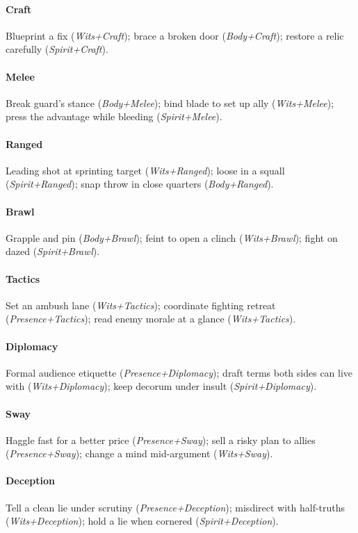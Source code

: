 \paragraph{Craft}
Blueprint a fix (\emph{Wits+Craft}); brace a broken door (\emph{Body+Craft}); restore a relic carefully (\emph{Spirit+Craft}).

\paragraph{Melee}
Break guard's stance (\emph{Body+Melee}); bind blade to set up ally (\emph{Wits+Melee}); press the advantage while bleeding (\emph{Spirit+Melee}).

\paragraph{Ranged}
Leading shot at sprinting target (\emph{Wits+Ranged}); loose in a squall (\emph{Spirit+Ranged}); snap throw in close quarters (\emph{Body+Ranged}).

\paragraph{Brawl}
Grapple and pin (\emph{Body+Brawl}); feint to open a clinch (\emph{Wits+Brawl}); fight on dazed (\emph{Spirit+Brawl}).

\paragraph{Tactics}
Set an ambush lane (\emph{Wits+Tactics}); coordinate fighting retreat (\emph{Presence+Tactics}); read enemy morale at a glance (\emph{Wits+Tactics}).

\paragraph{Diplomacy}
Formal audience etiquette (\emph{Presence+Diplomacy}); draft terms both sides can live with (\emph{Wits+Diplomacy}); keep decorum under insult (\emph{Spirit+Diplomacy}).

\paragraph{Sway}
Haggle fast for a better price (\emph{Presence+Sway}); sell a risky plan to allies (\emph{Presence+Sway}); change a mind mid-argument (\emph{Wits+Sway}).

\paragraph{Deception}
Tell a clean lie under scrutiny (\emph{Presence+Deception}); misdirect with half-truths (\emph{Wits+Deception}); hold a lie when cornered (\emph{Spirit+Deception}).

